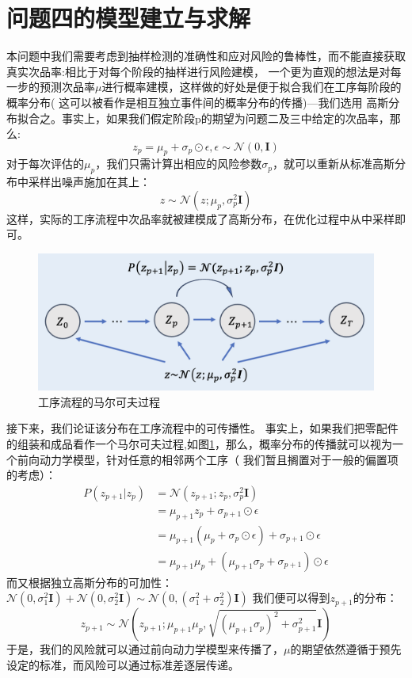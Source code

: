 \documentclass[withoutpreface,bwprint]{cumcmthesis} %
\begin{document}
\section{问题四的模型建立与求解}
本问题中我们需要考虑到抽样检测的准确性和应对风险的鲁棒性，而不能直接获取真实次品率:相比于对每个阶段的抽样进行风险建模，
一个更为直观的想法是对每一步的预测次品率$\mu$进行概率建模，这样做的好处是便于拟合我们在工序每阶段的概率分布(
这可以被看作是相互独立事件间的概率分布的传播)---我们选用
高斯分布拟合之。事实上，如果我们假定阶段p的期望为问题二及三中给定的次品率，那么:
\begin{equation}
	z_p = \mu_p + \sigma_p \odot \epsilon, \epsilon \sim \mathcal{N}(0, \mathbf{I})
\end{equation}
对于每次评估的$\mu_p$，我们只需计算出相应的风险参数$\sigma_p$，就可以重新从标准高斯分布中采样出噪声施加在其上：
\begin{equation}
	z \sim \mathcal{N}(z; \mu_p, \sigma_p^2 \mathbf{I})
\end{equation}
这样，实际的工序流程中次品率就被建模成了高斯分布，在优化过程中从中采样即可。
\begin{figure}[H]
	\includegraphics[width=\linewidth]{Fig/pro4.png}
	\caption{工序流程的马尔可夫过程}
	\label{fig:pro4}
\end{figure}
接下来，我们论证该分布在工序流程中的可传播性。
事实上，如果我们把零配件的组装和成品看作一个马尔可夫过程\cite{Markov},如图\ref{fig:pro4}，那么，概率分布的传播就可以视为一个前向动力学模型，针对任意的相邻两个工序（
我们暂且搁置对于一般的偏置项的考虑）：
\begin{equation}
	\begin{split}
		P(z_{p+1} | z_p) &= \mathcal{N}(z_{p+1};z_p, \sigma_p^2 \mathbf{I}) \\
		&= \mu_{p+1}z_p + \sigma_{p+1} \odot \epsilon \\
		& = \mu_{p+1}(\mu_p + \sigma_p \odot \epsilon) + \sigma_{p+1} \odot \epsilon \\
		& = \mu_{p+1}\mu_p + (\mu_{p+1}\sigma_p + \sigma_{p+1} )\odot \epsilon
	\end{split}
\end{equation}
而又根据独立高斯分布的可加性：$\mathcal{N}(0, \sigma_1^2 \mathbf{I}) + \mathcal{N}(0, \sigma_2^2 \mathbf{I}) \sim \mathcal{N}(0, (\sigma_1^2 + \sigma_2^2) \mathbf{I})$
我们便可以得到$z_{p+1}$的分布：
\begin{equation}
	z_{p+1} \sim \mathcal{N}(z_{p+1}; \mu_{p+1}\mu_p, \sqrt{(\mu_{p+1}\sigma_p)^2 +\sigma_{p+1}^2}\mathbf{I})
\end{equation}
于是，我们的风险就可以通过前向动力学模型来传播了，$\mu$的期望依然遵循于预先设定的标准，而风险可以通过标准差逐层传递\cite{diffusion}。
\end{document}
